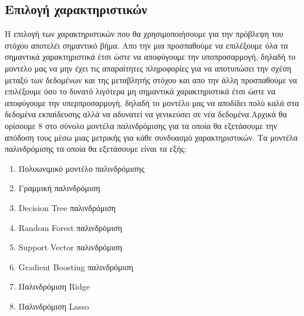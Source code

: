 \documentclass[12pt]{article}
\begin{document}
\subsection{Επιλογή χαρακτηριστικών}

Η επιλογή των χαρακτηριστικών που θα χρησιμοποιήσουμε για την πρόβλεψη του στόχου αποτελέι σημαντικό βήμα. Απο την μια προσπαθούμε να επιλέξουμε όλα τα σημαντικά χαρακτηριστικά έτσι ώστε να αποφύγουμε την υποπροσαρμογή, δηλαδή το μοντέλο μας να μην έχει τις απαραίτητες πληροφορίες για να αποτυπώσει την σχέση μεταξύ των δεδομένων και της μεταβλητής στόχου και απο την άλλη προσπαθούμε να επιλέξουμε όσο το δυνατό λιγότερα μη σημαντικά χαρακτηριστικά έτσι ώστε να αποφύγουμε την υπερπροσαρμογή, δηλαδή το μοντέλο μας να αποδίδει πολύ καλά στα δεδομένα εκπαίδευσης αλλά να αδυνατεί να γενικεύσει σε νέα δεδομένα.Αρχικά θα ορίσουμε 8 στο σύνολο μοντέλα παλινδρόμισης για τα οποία θα εξετάσουμε την απόδοση τους μέσω μιας μετρικής για κάθε συνδυασμό χαρακτηριστικών. Τα μοντέλα παλινδρόμισης τα οποία θα εξετάσουμε είναι τα εξής:\\
\begin{enumerate}
    \item Πολυωνιμικό μοντέλο παλινδρόμισης
    \item Γραμμική παλινδρόμιση
    \item Decision Tree παλινδρόμιση
    \item Random Forest παλινδρόμιση
    \item Support Vector παλινδρόμιση
    \item Gradient Boosting παλινδρόμιση
    \item Παλινδρόμιση Ridge
    \item Παλινδρόμιση Lasso\\
\end{enumerate}
\end{document}
